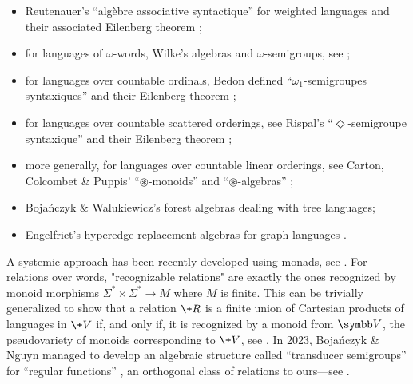 \begin{itemize}
	\item Reutenauer's ``algèbre associative syntactique'' for weighted languages
		\cite[Théorème I.2.1, p.~451]{Reutenauer1980SeriesFormelles} and their associated Eilenberg theorem \cite[Théorème III.1.1, p.~469]{Reutenauer1980SeriesFormelles};
	\item for languages of $\omega$-words, Wilke's algebras and $\omega$-semigroups,
		see \cite[\S II, pp.~75--131 \& \S VI, pp.~265--306]{Perrin2004InfiniteWords};
	\item for languages over countable ordinals, Bedon defined ``$\omega_1$-semi\-groupes syntaxiques'' \cite[\S3, pp.~49--109]{Bedon1998LangagesReconnaissables} and their Eilenberg theorem
		\cite[Theorem 22, p.~62]{Bedon1998Eilenberg};
	\item for languages over countable scattered orderings, see Rispal's ``$\Diamond$-semigroupe syntaxique'' \cite[\S 4.4, pp.~82--86]{Rispal2004Automates} and their Eilenberg theorem
		\cite[Theorem 6, p.~144]{Bedon2005Schutzenberger};
	\item more generally, for languages over countable linear orderings, see Carton, Colcombet \& Puppis' ``$\circledast$-monoids'' and ``$\circledast$-algebras''
		\cite[\S 3, p.~7]{Carton2018Algebraic};
	\item Bojańczyk \& Walukiewicz's 
		forest algebras \cite[\S 1.3, p.~4]{Bojanczyk2008Forest} \cite[\S 5, p.~159]{Bojanczyk2020MSO}
		dealing with tree languages;
	\item Engelfriet's hyperedge replacement algebras for graph languages
		\cite[\S 2.3, p.~100]{Courcelle2012Graph} \cite[\S 6.2, p.~194]{Bojanczyk2015Recognisable}.
\end{itemize}

A systemic approach has been recently developed using monads, see .
For relations over words, "recognizable 
relations" are exactly the ones recognized by monoid morphisms $\Sigma^* \times \Sigma^* \to M$ 
where $M$ is finite. This can be trivially generalized to show 
that a relation $\+R$ is a finite union of Cartesian products of languages in $\+V$ if, and only 
if, it is recognized by a monoid from $\B{V}$, the pseudovariety of monoids corresponding to
$\+V$, see .
In 2023, Bojańczyk \& Nguyn 
managed to develop an algebraic structure called ``transducer semigroups'' for ``regular functions'' \cite[Theorem 3.2, p.~6]{Bojanczyk2023Algebraic}, an 
orthogonal class of relations to ours---see .

